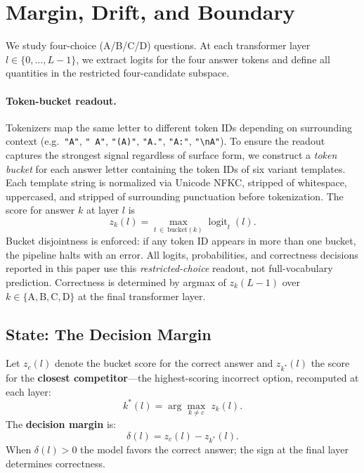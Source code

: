 \documentclass{article}
\begin{document}
\section{Margin, Drift, and Boundary}
\label{sec:primitives}

We study four-choice (A/B/C/D) questions.  At each transformer layer $l \in \{0,\ldots,L{-}1\}$, we extract logits for the four answer tokens and define all quantities in the restricted four-candidate subspace.

\paragraph{Token-bucket readout.}
Tokenizers map the same letter to different token IDs depending on surrounding context (e.g.\ \texttt{"A"}, \texttt{" A"}, \texttt{"(A)"}, \texttt{"A."}, \texttt{"A:"}, \texttt{"\textbackslash nA"}).
To ensure the readout captures the strongest signal regardless of surface form, we construct a \emph{token bucket} for each answer letter containing the token IDs of six variant templates.
Each template string is normalized via Unicode NFKC, stripped of whitespace, uppercased, and stripped of surrounding punctuation before tokenization.
The score for answer $k$ at layer $l$ is
\begin{equation}
  z_k(l) = \max_{t \,\in\, \mathrm{bucket}(k)} \operatorname{logit}_t(l).
  \label{eq:bucket}
\end{equation}
Bucket disjointness is enforced: if any token ID appears in more than one bucket, the pipeline halts with an error.  All logits, probabilities, and correctness decisions reported in this paper use this \emph{restricted-choice} readout, not full-vocabulary prediction.  Correctness is determined by argmax of $z_k(L{-}1)$ over $k \in \{\mathrm{A}, \mathrm{B}, \mathrm{C}, \mathrm{D}\}$ at the final transformer layer.

\subsection{State: The Decision Margin}

Let $z_c(l)$ denote the bucket score for the correct answer and $z_{k^*}(l)$ the score for the \textbf{closest competitor}---the highest-scoring incorrect option, recomputed at each layer:
\begin{equation}
  k^*(l) = \arg\max_{k \neq c}\; z_k(l).
  \label{eq:competitor}
\end{equation}
The \textbf{decision margin} is:
\begin{equation}
  \delta(l) = z_c(l) - z_{k^*}(l).
  \label{eq:delta}
\end{equation}
When $\delta(l) > 0$ the model favors the correct answer; the sign at the final layer determines correctness.
\end{document}
